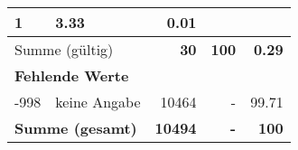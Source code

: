 \begin{longtable}{lXrrr}
       \num{1} &
       \num[round-mode=places,round-precision=2]{3.33} &
         \num[round-mode=places,round-precision=2]{0.01} \\
     \midrule
     \multicolumn{2}{l}{Summe (gültig)} &
       \textbf{\num{30}} &
     \textbf{\num{100}} &
       \textbf{\num[round-mode=places,round-precision=2]{0.29}} \\
     \multicolumn{5}{l}{\textbf{Fehlende Werte}}\\
       -998 &
       keine Angabe &
         \num{10464} &
        - &
         \num[round-mode=places,round-precision=2]{99.71} \\
     \midrule
     \multicolumn{2}{l}{\textbf{Summe (gesamt)}} &
          \textbf{\num{10494}} &
        \textbf{-} &
        \textbf{\num{100}} \\
     \bottomrule
     \end{longtable}
     
